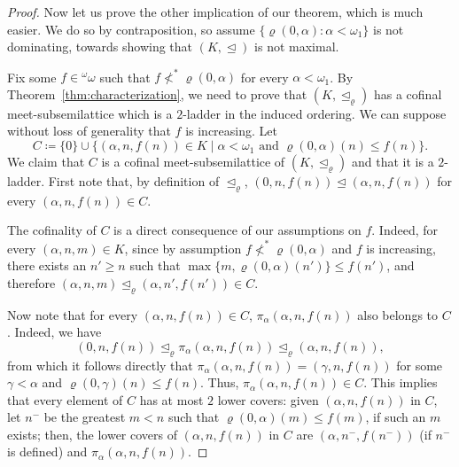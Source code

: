 \documentclass[]{amsart}
\theoremstyle{definition}
\theoremstyle{remark}
\begin{document}
\begin{proof}
Now let us prove the other implication of our theorem, which is much easier. We do so by contraposition, so assume  $\{\varrho(0, \alpha): \alpha < \omega_1\}$ is not dominating, towards showing that $(K, \trianglelefteq)$ is not maximal. 

Fix some $f \in {}^\omega \omega$ such that $f \not <^* \varrho(0, \alpha)$ for every $\alpha < \omega_1$.  By Theorem~\ref{thm:characterization}, we need to prove that $(K, \trianglelefteq_\varrho)$ has a cofinal meet-subsemilattice which is a $2$-ladder in the induced ordering. We can suppose without loss of generality that $f$ is increasing. Let
\[
C \coloneqq \{0\} \cup \{(\alpha, n, f(n)) \in K \mid \alpha < \omega_1 \text{ and } \varrho(0, \alpha)(n) \le f(n)\}.
\]
We claim that $C$ is a cofinal meet-subsemilattice of $(K, \trianglelefteq_\varrho)$ and that it is a $2$-ladder. First note that, by definition of $\trianglelefteq_\varrho$, $(0, n, f(n)) \trianglelefteq (\alpha, n, f(n))$ for every $(\alpha, n, f(n)) \in C$.

The cofinality of $C$ is a direct consequence of our assumptions on $f$. Indeed, for every $(\alpha, n, m) \in K$, since by assumption $f \not <^* \varrho(0, \alpha)$ and $f$ is increasing, there exists an $n' \ge n$ such that $\max\{m, \varrho(0, \alpha)(n')\} \le f(n')$, and therefore $(\alpha, n, m) \trianglelefteq_\varrho (\alpha, n', f(n')) \in C$.

Now note that for every $(\alpha, n, f(n)) \in C$, $\pi_\alpha (\alpha, n, f(n))$ also belongs to $C$. Indeed, we have
\[
(0, n, f(n)) \trianglelefteq_\varrho \pi_\alpha (\alpha, n, f(n)) \trianglelefteq_\varrho (\alpha, n, f(n)),
\]
from which it follows directly that $\pi_\alpha(\alpha, n, f(n)) = (\gamma, n, f(n))$ for some $\gamma < \alpha$ and $\varrho(0, \gamma)(n) \le f(n)$. Thus,  $\pi_\alpha (\alpha, n, f(n)) \in C$. This implies that every element of $C$ has at most $2$ lower covers: given $(\alpha, n, f(n))$ in $C$, let $n^-$ be the greatest $m < n$ such that $\varrho(0, \alpha)(m) \le f(m)$, if such an $m$ exists; then, the lower covers of $(\alpha, n, f(n))$ in $C$ are $(\alpha, n^-, f(n^-))$ (if $n^-$ is defined) and $\pi_\alpha (\alpha, n, f(n))$.


\end{proof}
\end{document}
